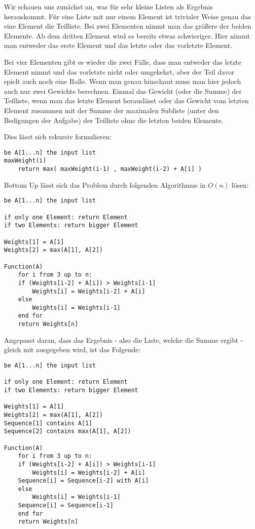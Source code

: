 \documentclass{article}
\begin{document}
Wir schauen uns zunächst an, was für sehr kleine Listen als Ergebnis
herauskommt. Für eine Liste mit nur einem Element ist trivialer Weise genau das
eine Element die Teilliste. Bei zwei Elementen nimmt man das größere der beiden
Elemente. Ab dem dritten Element wird es bereits etwas schwieriger. Hier nimmt
man entweder das erste Element und das letzte oder das vorletzte Element. 

Bei vier Elementen gibt es wieder die zwei Fälle, dass man entweder das letzte
Element nimmt und das vorletzte nicht oder umgekehrt, aber der Teil davor spielt
auch noch eine Rolle. Wenn man genau hinschaut muss man hier jedoch auch nur
zwei Gewichte berechnen. Einmal das Gewicht (oder die Summe) der Teilliste, wenn
man das letzte Element herauslässt oder das Gewicht vom letzten Element zusammen
mit der Summe der maximalen Subliste (unter den Bedigungen der Aufgabe) der
Teilliste ohne die letzten beiden Elemente.

Dies lässt sich rekursiv formulieren:
\begin{verbatim}
be A[1...n] the input list
maxWeight(i)
    return max( maxWeight(i-1) , maxWeight(i-2) + A[i] )
\end{verbatim}

Bottom Up lässt sich das Problem durch folgenden Algorithmus in \(O(n)\) lösen:
\begin{verbatim}
be A[1...n] the input list

if only one Element: return Element
if two Elements: return bigger Element

Weights[1] = A[1]
Weights[2] = max(A[1], A[2])

Function(A)
    for i from 3 up to n:
    if (Weights[i-2] + A[i]) > Weights[i-1]
        Weights[i] = Weights[i-2] + A[i]
    else
        Weights[i] = Weights[i-1]
    end for
    return Weights[n]
\end{verbatim}

Angepasst daran, dass das Ergebnis - also die Liste, welche die Summe ergibt -
gleich mit ausgegeben wird, ist das Folgende:

\begin{verbatim}
be A[1...n] the input list

if only one Element: return Element
if two Elements: return bigger Element

Weights[1] = A[1]
Weights[2] = max(A[1], A[2])
Sequence[1] contains A[1]
Sequence[2] contains max(A[1], A[2])

Function(A)
    for i from 3 up to n:
    if (Weights[i-2] + A[i]) > Weights[i-1]
        Weights[i] = Weights[i-2] + A[i]
	Sequence[i] = Sequence[i-2] with A[i]
    else
        Weights[i] = Weights[i-1]
	Sequence[i] = Sequence[i-1]
    end for
    return Weights[n]
\end{verbatim}
\end{document}
